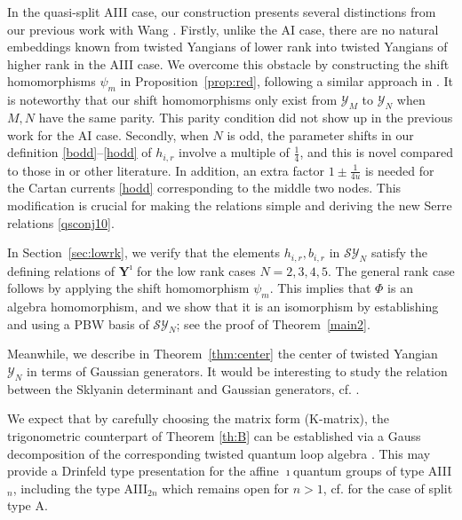 \documentclass[11pt,reqno]{amsart}
\numberwithin{equation}{section}
\theoremstyle{definition}
\theoremstyle{remark}
\newcommand{\Y}{{\mathscr{Y}}}
\newcommand{\SY}{{\mathscr{SY}}}
\newcommand{\Yi}{{\mathbf{Y}^\imath}}
\begin{document}
In the quasi-split AIII case, our construction presents several distinctions from our previous work with Wang \cite{KLWZ23a}. Firstly, unlike the AI case, there are no natural embeddings known from twisted Yangians of lower rank into twisted Yangians of higher rank in the AIII case. We overcome this obstacle by constructing the shift homomorphisms $\psi_{m}$ in Proposition~\ref{prop:red}, following a similar approach in \cite{JLM18}. It is noteworthy that our shift homomorphisms only exist from $\Y_{M}$ to $\Y_N$ when $M,N$ have the same parity. This parity condition did not show up in the previous work \cite{KLWZ23a} for the AI case. Secondly, when $N$ is odd, the parameter shifts in our  definition \eqref{bodd}--\eqref{hodd} of $h_{i,r}$ involve a multiple of $\frac{1}{4}$, and this is novel compared to those in \cite{BK05,JLM18,FT23,KLWZ23a} or other literature. In addition, an extra factor $1\pm\frac{1}{4u}$ is needed for the Cartan currents \eqref{hodd} corresponding to the middle two nodes. This modification is crucial for making the relations simple and deriving the new Serre relations \eqref{qsconj10}.

In Section~\ref{sec:lowrk}, we verify that the elements $h_{i,r}, b_{i,r}$ in $\SY_{N}$ satisfy the defining relations of $\Yi$ for the low rank cases $N=2,3,4,5$. The general rank case follows by applying the shift homomorphism $\psi_{m}$. This implies that $\Phi$ is an algebra homomorphism, and we show that it is an isomorphism by establishing and using a PBW basis of $\SY_N$; see the proof of Theorem~\ref{main2}.

Meanwhile, we describe in Theorem~\ref{thm:center} the center of twisted Yangian $\Y_N$ in terms of Gaussian generators. It would be interesting to study the relation between the Sklyanin determinant \cite[Thm. 3.4]{MR02} and Gaussian generators, cf. \cite[Thm. 2.12.1]{Mol07}.


We expect that by carefully choosing the matrix form (K-matrix), the trigonometric counterpart of Theorem \ref{th:B} can be established via a Gauss decomposition of the corresponding twisted quantum loop algebra \cite{CGM14}. This may provide a Drinfeld type presentation for the affine $\imath$quantum groups of type AIII$_{n}$, including the type AIII$_{2n}$ which remains open for $n>1$, cf. \cite{Lu24} for the case of split type A.
\end{document}
